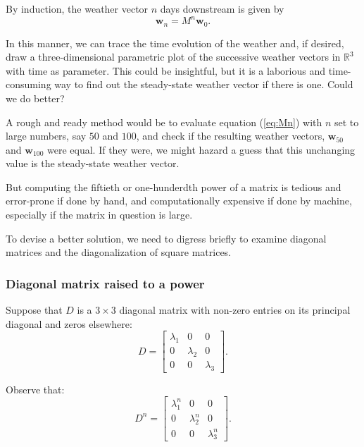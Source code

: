 \documentclass[
  12pt,
  a4paper,
]{article}
\begin{document}
By induction, the weather vector \(n\) days downstream is given by
\begin{equation}
\symbf{w}_{n} = M^{n}\symbf{w}_{0}.
\label{eq:Mn}\end{equation}

In this manner, we can trace the time evolution of the weather and, if
desired, draw a three-dimensional parametric plot of the successive
weather vectors in \(\mathbb{R}^{3}\) with time as parameter. This could
be insightful, but it is a laborious and time-consuming way to find out
the steady-state weather vector if there is one. Could we do better?

A rough and ready method would be to evaluate equation (\ref{eq:Mn})
with \(n\) set to large numbers, say \(50\) and \(100\), and check if
the resulting weather vectors, \(\symbf{w}_{50}\) and
\(\symbf{w}_{100}\) were equal. If they were, we might hazard a guess
that this unchanging value is the steady-state weather vector.

But computing the fiftieth or one-hunderdth power of a matrix is tedious
and error-prone if done by hand, and computationally expensive if done
by machine, especially if the matrix in question is large.

To devise a better solution, we need to digress briefly to examine
diagonal matrices and the diagonalization of square matrices.

\hypertarget{diagonal-matrix-raised-to-a-power}{%
\subsubsection{Diagonal matrix raised to a
power}\label{diagonal-matrix-raised-to-a-power}}

Suppose that \(D\) is a \(3 \times 3\) diagonal matrix with non-zero
entries on its principal diagonal and zeros elsewhere: \[
D = \begin{bmatrix}
\lambda_{1} & 0 & 0\\
0 & \lambda_{2} & 0\\
0 & 0 & \lambda_{3}
\end{bmatrix}.
\]

Observe that: \begin{equation}
D^{n} = \begin{bmatrix}
\lambda_{1}^{n}& 0 & 0\\
0 & \lambda_{2} ^{n}& 0\\
0 & 0 & \lambda_{3}^{n}
\end{bmatrix}.
\label{eq:D-to-the-n}\end{equation}
\end{document}
